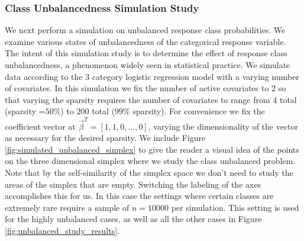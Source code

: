 \subsubsection{Class Unbalancedness Simulation Study}
We next perform a simulation on unbalanced response class probabilities. We examine various states of unbalancedness of the categorical response variable. The intent of this simulation study is to determine the effect of response class unbalancedness, a phenomenon widely seen in statistical practice. We simulate data according to the $3$ category logistic regression model with a varying number of covariates. In this simulation we fix the number of active covariates to $2$ so that varying the sparsity requires the number of covariates to range from $4$ total (sparsity =$50\%$) to $200$ total ($99\%$ sparsity). For convenience we fix the coefficient vector at $\vec{\beta}^T =[1,1,0,\dots, 0]$, varying the dimensionality of the vector as necessary for the desired sparsity. We include Figure \ref{fig:simulated_unbalanced_simplex} to give the reader a visual idea of the points on the three dimensional simplex where we study the class unbalanced problem. Note that by the self-similarity of the simplex space we don't need to study the areas of the simplex that are empty. Switching the labeling of the axes accomplishes this for us. In this case the settings where certain classes are extremely rare require a sample of $n=10000$ per simulation. This setting is used for the highly unbalanced cases, as well as all the other cases in Figure \ref{fig:unbalanced_study_results}.


